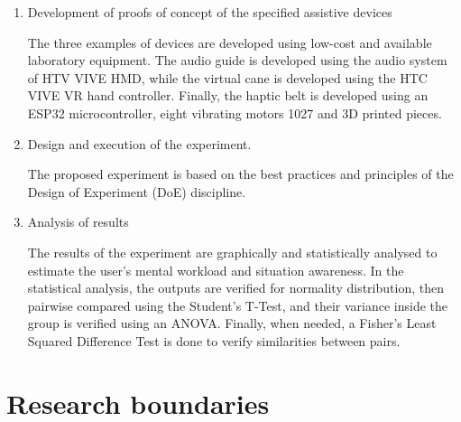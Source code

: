 \begin{enumerate}[leftmargin = 6em, label = Step \arabic* -- ]
    \item Development of proofs of concept of the specified assistive devices
    
    The three examples of devices are developed using low-cost and available laboratory equipment. The audio guide is developed using the audio system of HTV VIVE HMD, while the virtual cane is developed using the HTC VIVE VR hand controller. Finally, the haptic belt is developed using an ESP32 microcontroller, eight vibrating motors 1027 and 3D printed pieces.
    
    \item Design and execution of the experiment.
    
    The proposed experiment is based on the best practices and principles of the Design of Experiment (DoE) discipline.

    
    \item Analysis of results
    
    The results of the experiment are graphically and statistically analysed to estimate the user's mental workload and situation awareness. In the statistical analysis, the outputs are verified for normality distribution, then pairwise compared using the Student's T-Test, and their variance inside the group is verified using an ANOVA. Finally, when needed, a Fisher's Least Squared Difference Test is done to verify similarities between pairs.

\end{enumerate}


\FloatBarrier

\section{Research boundaries}


